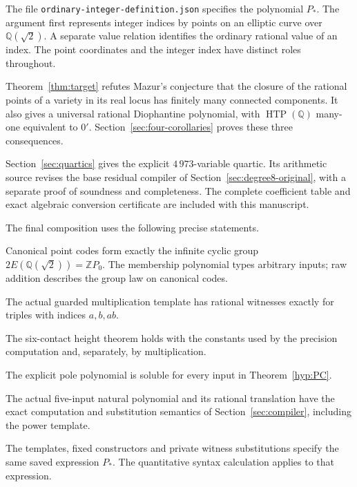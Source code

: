 \documentclass[11pt]{article}
\theoremstyle{definition}
\theoremstyle{remark}
\newcommand{\Q}{\mathbb Q}
\newcommand{\Z}{\mathbb Z}
\begin{document}
The file \nolinkurl{ordinary-integer-definition.json} specifies the
polynomial $P_*$. The argument first represents integer indices by points
on an elliptic curve over $\Q(\sqrt2)$. A separate value relation identifies
the ordinary rational value of an index. The point coordinates and the
integer index have distinct roles throughout.

Theorem~\ref{thm:target} refutes Mazur's conjecture that the closure of
the rational points of a variety in its real locus has finitely many
connected components. It also gives a universal rational Diophantine
polynomial, with
$\operatorname{HTP}(\Q)$ many-one equivalent to $0'$.
Section~\ref{sec:four-corollaries} proves these three consequences.

Section~\ref{sec:quartics} gives the explicit $4\,973$-variable quartic.
Its arithmetic source revises the base residual compiler of
Section~\ref{sec:degree8-original}, with a separate proof of soundness and
completeness. The complete coefficient table and exact algebraic conversion
certificate are included with this manuscript.

The final composition uses the following precise statements.
\begin{description}[style=nextline,leftmargin=1.8cm]
\item[$\mathsf G$] Canonical point codes form exactly the infinite cyclic
group $2E(\Q(\sqrt2))=\Z P_0$. The membership polynomial types arbitrary inputs;
raw addition describes the group law on canonical codes.
\item[$\mathsf M$] The actual guarded multiplication template has rational
witnesses exactly for triples with indices $a,b,ab$.
\item[$\mathsf H$] The six-contact height theorem holds with the constants
used by the precision computation and, separately, by multiplication.
\item[$\mathsf{PC}$] The explicit pole polynomial is soluble for every
input in Theorem~\ref{hyp:PC}.
\item[$\mathsf C$] The actual five-input natural polynomial and its
rational translation have the exact computation and substitution semantics
of Section~\ref{sec:compiler}, including the power template.
\item[$\mathsf B$] The templates, fixed constructors and private witness
substitutions specify the same saved expression $P_*$. The quantitative
syntax calculation applies to that expression.
\end{description}
\end{document}
